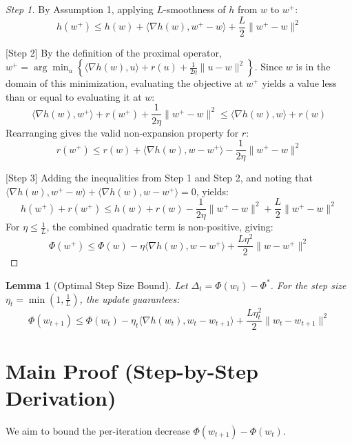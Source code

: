 \documentclass{article}
\newtheorem{lemma}{Lemma}
\begin{document}
\begin{proof}
[Step 1] By Assumption 1, applying $L$-smoothness of $h$ from $w$ to $w^+$:
\begin{equation}
    h(w^+) \leq h(w) + \langle \nabla h(w), w^+ - w \rangle + \frac{L}{2} \|w^+ - w\|^2
\end{equation}

[Step 2] By the definition of the proximal operator, $w^+ = \arg\min_{u} \left\{ \langle \nabla h(w), u \rangle + r(u) + \frac{1}{2\eta} \|u - w\|^2 \right\}$. Since $w$ is in the domain of this minimization, evaluating the objective at $w^+$ yields a value less than or equal to evaluating it at $w$:
\begin{equation}
    \langle \nabla h(w), w^+ \rangle + r(w^+) + \frac{1}{2\eta} \|w^+ - w\|^2 \leq \langle \nabla h(w), w \rangle + r(w)
\end{equation}
Rearranging gives the valid non-expansion property for $r$:
\begin{equation}
    r(w^+) \leq r(w) + \langle \nabla h(w), w - w^+ \rangle - \frac{1}{2\eta} \|w^+ - w\|^2
\end{equation}

[Step 3] Adding the inequalities from Step 1 and Step 2, and noting that $\langle \nabla h(w), w^+ - w \rangle + \langle \nabla h(w), w - w^+ \rangle = 0$, yields:
\begin{equation}
    h(w^+) + r(w^+) \leq h(w) + r(w) - \frac{1}{2\eta} \|w^+ - w\|^2 + \frac{L}{2} \|w^+ - w\|^2
\end{equation}
For $\eta \leq \frac{1}{L}$, the combined quadratic term is non-positive, giving:
\begin{equation}
    \Phi(w^+) \leq \Phi(w) - \eta \langle \nabla h(w), w - w^+ \rangle + \frac{L \eta^2}{2} \|w - w^+\|^2
\end{equation}
\end{proof}

\begin{lemma}[Optimal Step Size Bound]
Let $\Delta_t = \Phi(w_t) - \Phi^*$. For the step size $\eta_t = \min\left(1, \frac{1}{L}\right)$, the update guarantees:
\begin{equation}
    \Phi(w_{t+1}) \leq \Phi(w_t) - \eta_t \langle \nabla h(w_t), w_t - w_{t+1} \rangle + \frac{L\eta_t^2}{2}\|w_t - w_{t+1}\|^2
\end{equation}
\end{lemma}

\section*{Main Proof (Step-by-Step Derivation)}
We aim to bound the per-iteration decrease $\Phi(w_{t+1}) - \Phi(w_t)$.
\end{document}
